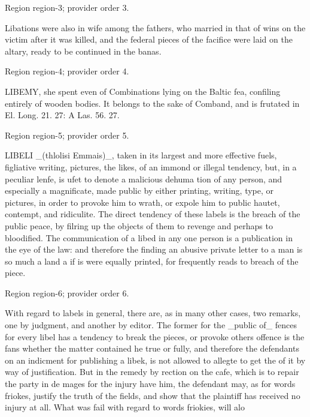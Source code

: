 \documentclass[11pt]{article}
\begin{document}
{\scriptsize\color{gray} Region region-3; provider order 3.\par}
\medskip

Libations were also in wife among the fathers, who married in that of wins on the victim after it was killed, and the federal pieces of the facifice were laid on the altary, ready to be continued in the banas.
\par

{\scriptsize\color{gray} Region region-4; provider order 4.\par}
\medskip

LIBEMY, she spent even of Combinations lying on the Baltic fea, confiling entirely of wooden bodies. It belongs to the sake of Comband, and is frutated in El. Long. 21. 27: A Las. 56. 27.
\par

{\scriptsize\color{gray} Region region-5; provider order 5.\par}
\medskip

LIBELI \_(thlolisi Emmais)\_, taken in its largest and more effective fuels, figliative writing, pictures, the likes, of an immond or illegal tendency, but, in a peculiar lenfe, is ufet to denote a malicious dehuma tion of any person, and especially a magnificate, made public by either printing, writing, type, or pictures, in order to provoke him to wrath, or expole him to public hautet, contempt, and ridiculite. The direct tendency of these labels is the breach of the public peace, by filring up the objects of them to revenge and perhaps to bloodified. The communication of a libed in any one person is a publication in the eye of the law: and therefore the finding an abusive private letter to a man is so much a land a if is were equally printed, for frequently reads to breach of the piece.
\par

{\scriptsize\color{gray} Region region-6; provider order 6.\par}
\medskip

With regard to labels in general, there are, as in many other cases, two remarks, one by judgment, and another by editor. The former for the \_public of\_ fences for every libel has a tendency to break the pieces, or provoke others offence is the fans whether the matter contained he true or fully, and therefore the defendants on an indicment for publishing a libek, is not allowed to allegte to get the of it by way of justification. But in the remedy by rection on the cafe, which is to repair the party in de mages for the injury have him, the defendant may, as for words friokes, justify the truth of the fields, and show that the plaintiff has received no injury at all. What was fail with regard to words friokies, will alo
\par
\end{document}
